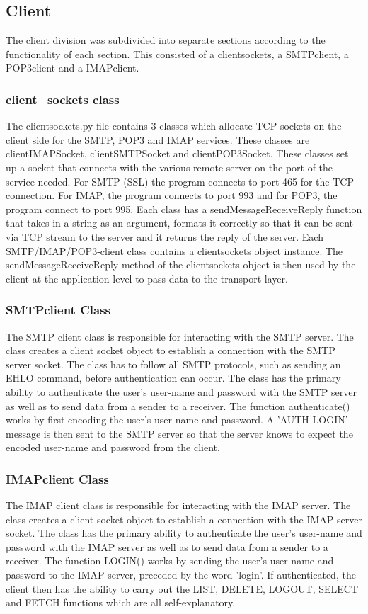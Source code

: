 \documentclass[11pt]{article}
\begin{document}
\begin{multicols}{2}
\subsection{Client}
The client division was subdivided into separate sections according to the functionality of each section. This consisted of a client\textunderscore sockets, a SMTPclient, a POP3client and a IMAPclient.
\subsubsection{client\_sockets class}
The client\textunderscore sockets.py file contains 3 classes which allocate TCP sockets on the client side for the SMTP, POP3 and IMAP services. These classes are clientIMAPSocket, clientSMTPSocket and clientPOP3Socket. These classes set up a socket that connects with the various remote server on the port of the service needed. For SMTP (SSL) the program connects to port 465 for the TCP connection. For IMAP, the program connects to port 993 and for POP3, the program connect to port 995. Each class has a sendMessageReceiveReply function that takes in a string as an argument, formats it correctly so that it can be sent via TCP stream to the server and it returns the reply of the server. Each SMTP/IMAP/POP3-client class contains a client\textunderscore sockets object instance. The sendMessageReceiveReply method of the client\textunderscore sockets object is then used by the client at the application level to pass data to the transport layer.
\subsubsection{SMTPclient Class}
The SMTP client class is responsible for interacting with the SMTP server. The class creates a client socket object to establish a connection with the SMTP server socket. The class has to follow all SMTP protocols, such as sending an EHLO command, before authentication can occur. The class has the primary ability to authenticate the user's user-name and password with the SMTP server as well as to send data from a sender to a receiver. The function authenticate() works by first encoding the user's user-name and password. A 'AUTH LOGIN' message is then sent to the SMTP server so that the server knows to expect the encoded user-name and password from the client.
\subsubsection{IMAPclient Class}
The IMAP client class is responsible for interacting with the IMAP server. The class creates a client socket object to establish a connection with the IMAP server socket. The class has the primary ability to authenticate the user's user-name and password with the IMAP server as well as to send data from a sender to a receiver. The function LOGIN() works by sending the user's user-name and password to the IMAP server, preceded by the word 'login'. If authenticated, the client then has the ability to carry out the LIST, DELETE, LOGOUT, SELECT and FETCH functions which are all self-explanatory.

\end{multicols}
\end{document}
